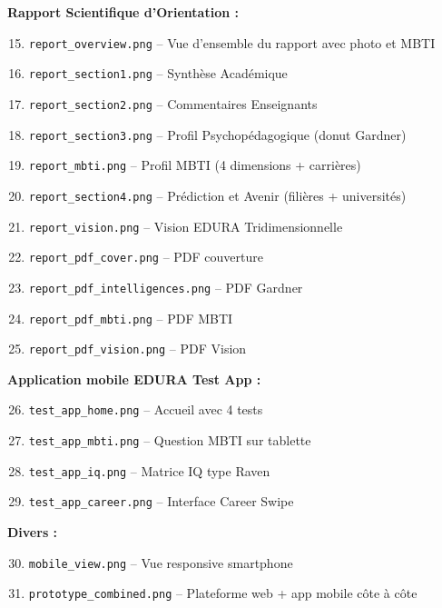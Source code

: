 \documentclass[12pt,a4paper,oneside]{report}
\begin{document}
\textbf{Rapport Scientifique d'Orientation :}
\begin{enumerate}
\setcounter{enumi}{14}
  \item \texttt{report\_overview.png} -- Vue d'ensemble du rapport avec photo et MBTI
  \item \texttt{report\_section1.png} -- Synthèse Académique
  \item \texttt{report\_section2.png} -- Commentaires Enseignants
  \item \texttt{report\_section3.png} -- Profil Psychopédagogique (donut Gardner)
  \item \texttt{report\_mbti.png} -- Profil MBTI (4 dimensions + carrières)
  \item \texttt{report\_section4.png} -- Prédiction et Avenir (filières + universités)
  \item \texttt{report\_vision.png} -- Vision EDURA Tridimensionnelle
  \item \texttt{report\_pdf\_cover.png} -- PDF couverture
  \item \texttt{report\_pdf\_intelligences.png} -- PDF Gardner
  \item \texttt{report\_pdf\_mbti.png} -- PDF MBTI
  \item \texttt{report\_pdf\_vision.png} -- PDF Vision
\end{enumerate}

\textbf{Application mobile EDURA Test App :}
\begin{enumerate}
\setcounter{enumi}{25}
  \item \texttt{test\_app\_home.png} -- Accueil avec 4 tests
  \item \texttt{test\_app\_mbti.png} -- Question MBTI sur tablette
  \item \texttt{test\_app\_iq.png} -- Matrice IQ type Raven
  \item \texttt{test\_app\_career.png} -- Interface Career Swipe
\end{enumerate}

\textbf{Divers :}
\begin{enumerate}
\setcounter{enumi}{29}
  \item \texttt{mobile\_view.png} -- Vue responsive smartphone
  \item \texttt{prototype\_combined.png} -- Plateforme web + app mobile côte à côte
\end{enumerate}

\end{document}
